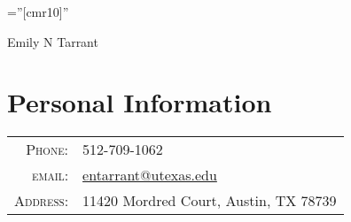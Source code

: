 \documentclass[a4paper,10pt]{article}
\begin{document}
\pagestyle{empty} %

\font\fb=''[cmr10]'' %

\par{\centering
  {\Huge Emily N Tarrant
}\bigskip\par}

\section{Personal Information}

\begin{tabular}{rl}
    \textsc{Phone:}     & 512-709-1062\\
    \textsc{email:}     & \href{mailto:entarrant@utexas.edu}{entarrant@utexas.edu} \\
    \textsc{Address:}   & 11420 Mordred Court, Austin, TX 78739
\end{tabular}

\end{document}
